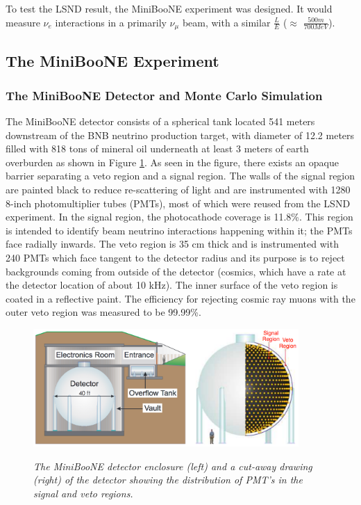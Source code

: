 To test the LSND result, the MiniBooNE experiment was designed. It would measure $\nu_e$ interactions in a primarily $\nu_\mu$ beam, with a similar $\frac{L}{E}$ ($\approx$ $\frac{500m}{700 MeV}$).


\subsection{The MiniBooNE Experiment}

\subsubsection{The MiniBooNE Detector and Monte Carlo Simulation}



The MiniBooNE detector \cite{MBDetectorPaper} consists of a spherical tank located 541 meters downstream of the BNB neutrino production target, with diameter of 12.2 meters filled with 818 tons of mineral oil underneath at least 3 meters of earth overburden as shown in Figure \ref{MB_detector_fig}. As seen in the figure, there exists an opaque barrier separating a veto region and a signal region. The walls of the signal region are painted black to reduce re-scattering of light and are instrumented with 1280 8-inch photomultiplier tubes (PMTs), most of which were reused from the LSND experiment. In the signal region, the photocathode coverage is 11.8\%. This region is intended to identify beam neutrino interactions happening within it; the PMTs face radially inwards. The veto region is 35 cm thick and is instrumented with 240 PMTs which face tangent to the detector radius and its purpose is to reject backgrounds coming from outside of the detector (cosmics, which have a rate at the detector location of about 10 kHz). The inner surface of the veto region is coated in a reflective paint. The efficiency for rejecting cosmic ray muons with the outer veto region was measured to be 99.99\%.\\

\begin{figure}[ht!]
\centering
	\includegraphics[width=0.9\textwidth]{Figures/MB_detectorpaper_fig.png} \\
\caption{\textit{The MiniBooNE detector enclosure (left) and a cut-away drawing (right) of the detector showing the distribution of PMT's in the signal and veto regions.}}\label{MB_detector_fig}
\end{figure}

